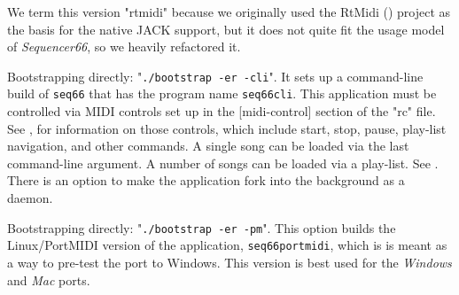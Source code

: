         We term this version "rtmidi" because we originally
        used the RtMidi (\cite{rtmidi}) project as the basis for the native
        JACK support, but it does not quite fit the usage model
        of \textsl{Sequencer66}, so we heavily refactored it.

        Bootstrapping directly:
        "\texttt{./bootstrap -er -cli}".
        It sets up a command-line build of \texttt{seq66} that has the
        program name \texttt{seq66cli}.
        This application must be controlled via MIDI controls set up in the
        [midi-control] section of the "rc" file.
        See , for
        information on those controls, which include start, stop,
        pause, play-list navigation, and other commands.
        A single song can be loaded via the last command-line argument.
        A number of songs can be loaded via a play-list.
        See .
        There is an option to make
        the application fork into the background as a daemon.
%

        Bootstrapping directly:
        "\texttt{./bootstrap -er -pm}".
        This option builds the Linux/PortMIDI version of the application,
        \texttt{seq66portmidi},
        which is is meant as a way to pre-test the
        port to Windows.
        This version is best used for the \textsl{Windows} and
        \textsl{Mac} ports.

%

